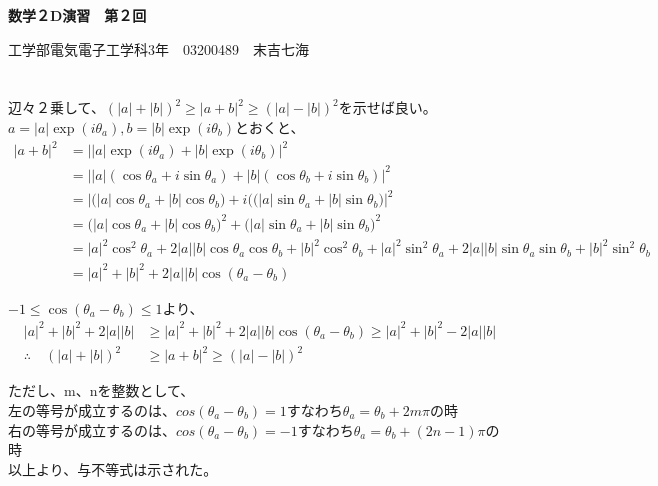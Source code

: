 \documentclass[dvipdfmx,a4paper]{jsarticle}
\begin{document}
\begin{center}
\textbf{\huge{数学２D演習　第２回}}
\end{center}

\begin{flushright}
工学部電気電子工学科3年　03200489　末吉七海\\
\end{flushright}

\section{}

\subsection{}

辺々２乗して、$(|a| + |b|) ^2 \geq | a+b| ^2  \geq(|a| - |b|) ^2$を示せば良い。\\
$a = |a|\exp{(i\theta_a)}, b = |b|\exp{(i\theta_b)}$とおくと、
\begin{align*}
|a + b|^2 &= \bigl||a|\exp{(i\theta_a)} + |b|\exp{(i\theta_b)}\bigr|^2\\
&= \bigl||a|(\cos{\theta_a} + i\sin{\theta_a}) + |b|(\cos{\theta_b} + i\sin{\theta_b})\bigr|^2\\
&= \bigl|\bigl(|a|\cos{\theta_a} + |b|\cos{\theta_b}\bigr) + i(\bigl(|a|\sin{\theta_a} + |b|\sin{\theta_b}\bigr)\bigr|^2\\
 &= \bigl(|a|\cos{\theta_a} + |b|\cos{\theta_b}\bigr)^2 + \bigl(|a|\sin{\theta_a} + |b|\sin{\theta_b}\bigr)^2\\
 &= |a|^2\cos^2{\theta_a} + 2|a||b|\cos{\theta_a}\cos{\theta_b} + |b|^2\cos^2{\theta_b} + |a|^2\sin^2{\theta_a} + 2|a||b|\sin{\theta_a}\sin{\theta_b} + |b|^2\sin^2{\theta_b}\\
 &= |a|^2 + |b|^2 + 2|a||b|\cos{(\theta_a -\theta_b)}
\end{align*}

$-1\leq\cos{(\theta_a -\theta_b)}\leq 1$より、
\begin{align*}
|a|^2 + |b|^2 + 2|a||b| &\geq |a|^2 + |b|^2 + 2|a||b|\cos{(\theta_a -\theta_b)} \geq |a|^2 + |b|^2 - 2|a||b|\\
\therefore \quad (|a| + |b|)^2 &\geq |a + b|^2 \geq (|a| - |b|)^2
\end{align*}

ただし、m、nを整数として、\\
\qquad 左の等号が成立するのは、$cos{(\theta_a -\theta_b)}=1$すなわち$\theta_a = \theta_b+2m\pi$の時\\
\qquad 右の等号が成立するのは、$cos{(\theta_a -\theta_b)}=-1$すなわち$\theta_a = \theta_b+(2n-1)\pi$の時\\
以上より、与不等式は示された。\\
\end{document}
